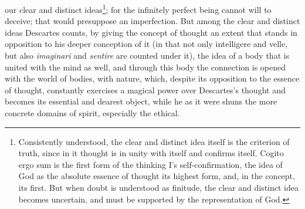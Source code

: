 \documentclass[12pt,a4paper,openany]{book}
\begin{document}
our clear and distinct ideas\footnote{Consistently understood, the clear
and distinct idea itself is the criterion of truth, since in it thought
is in unity with itself and confirms itself. Cogito ergo sum is the
first form of the thinking I's self-confirmation, the idea of God as the
absolute essence of thought its highest form, and, in the concept, its
first. But when doubt is understood as finitude, the clear and distinct
idea becomes uncertain, and must be supported by the representation of
God.}; for the infinitely perfect being cannot will to deceive; that
would presuppose an imperfection. But among the clear and distinct ideas
Descartes counts, by giving the concept of thought an extent that stands
in opposition to his deeper conception of it (in that not only
intelligere and velle, but also \emph{imaginari} and \emph{sentire} are
counted under it), the idea of a body that is united with the mind as
well, and through this body the connection is opened with the world of
bodies, with nature, which, despite its opposition to the essence of
thought, constantly exercises a magical power over Descartes's thought
and becomes its essential and dearest object, while he as it were shuns
the more concrete domains of spirit, especially the ethical.
\end{document}
